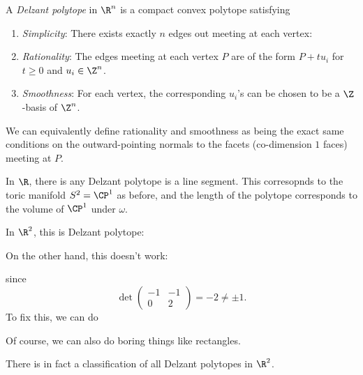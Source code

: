 \documentclass[a4paper]{article}
\begin{document}
\begin{defi}
  A \emph{Delzant polytope} in $\R^n$ is a compact convex polytope satisfying
  \begin{enumerate}
    \item \emph{Simplicity}: There exists exactly $n$ edges out meeting at each vertex:
    \item \emph{Rationality}: The edges meeting at each vertex $P$ are of the form $P + t u_i$ for $t \geq 0$ and $u_i \in \Z^n$.
    \item \emph{Smoothness}: For each vertex, the corresponding $u_i$'s can be chosen to be a $\Z$-basis of $\Z^n$.
  \end{enumerate}
\end{defi}
We can equivalently define rationality and smoothness as being the exact same conditions on the outward-pointing normals to the facets (co-dimension $1$ faces) meeting at $P$. 

\begin{eg}
  In $\R$, there is any Delzant polytope is a line segment. This corresopnds to the toric manifold $S^2 = \CP^1$ as before, and the length of the polytope corresponds to the volume of $\CP^1$ under $\omega$.
\end{eg}

\begin{eg}
  In $\R^2$, this is  Delzant polytope:
  \begin{center}
  \end{center}
  On the other hand, this doesn't work:
  \begin{center}
  \end{center}
  since
  \[
    \det
    \begin{pmatrix}
      -1 & -1\\
      0 & 2
    \end{pmatrix} = -2 \not= \pm 1.
  \]
  To fix this, we can do
  \begin{center}
  \end{center}
  Of course, we can also do boring things like rectangles.
\end{eg}
There is in fact a classification of all Delzant polytopes in $\R^2$.
\end{document}
